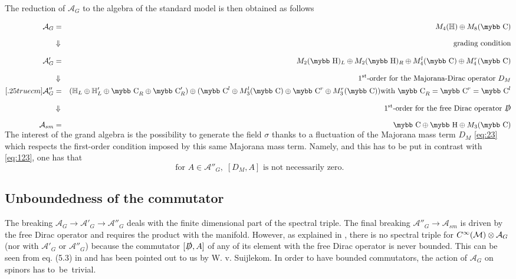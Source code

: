 \documentclass[11pt]{article}
\newcommand{\cinf}{{C^\infty({\cal M})}}
\newcommand{\A}{\mathcal A}
\def\bb#1{\hbox{\mybb#1}}
\begin{document}
\noindent The reduction of $\A_G$ to
  the algebra of the standard model is then obtained as follows
\begin{framed}
\vspace{-.5truecm}

  \begin{eqnarray}
    \label{eq:50}
\mathcal{A}_{G}&=& M_4(\mathbb{H}) \oplus M_8(\bb C) \\[.25truecm]
\nonumber 
&\Downarrow& \hspace{0truecm}\text{grading condition}\\[.25truecm] 
\nonumber
{\cal A}'_G &=& M_2(\bb H)_L\oplus  M_2(\bb H)_R\oplus M_4^l(\bb C) \oplus M_4^r(\bb C)\\[.25truecm]  
\nonumber 
&\Downarrow& \hspace{0truecm}\text{$1^\text{st}$-order for the Majorana-Dirac operator $D_M$}\\ [.25truecm] 
   \nonumber
    \A''_G &=& (\mathbb H_L \oplus \mathbb H'_L \oplus \bb C_R \oplus \bb C'_R) \oplus (\bb C^l\oplus M_3^l(\bb C) \oplus \bb C^r \oplus M^r_3(\bb C))
 \text{with }\bb C_R = \bb C^r=\bb C^l\\[.25truecm] 
\nonumber &\Downarrow&\hspace{0truecm} \text{$1^\text{st}$-order for
  the free Dirac operator $\slashed D$}\\[.25truecm] 
\nonumber
\A_{sm} &=& \bb C \oplus \bb H \oplus M_3(\bb C) \\[-1truecm] 
\vspace{-1.75truecm}
\end{eqnarray}
\end{framed}
The interest of the grand algebra is the 
possibility to generate the
field $\sigma$ thanks to a fluctuation of the Majorana mass term
$D_M$ \eqref{eq:23} which
respects the first-order condition imposed by this same Majorana mass
term. Namely, and  this has to be put in contrast
with \eqref{eq:123}, one has that  \cite{Devastato:2013fk} 
\begin{equation}
\text{ for } A\in\A''_G, \; [D_M, A] \text{ is not
  necessarily zero.}\label{eq:82}
  \end{equation}
\subsection{Unboundedness of the commutator}
\label{unboundsection}

The breaking $\A_G\to\A'_G\to\A''_G$ deals with
the finite
dimensional part of the spectral triple. The final breaking
$\A''_G\to\A_{sm}$ is driven by the free Dirac operator and requires
the product with the manifold. However, as explained in \cite{Devastato:2014fk}, there is no spectral triple
for $\cinf\otimes\A_G$ (nor with $\A'_G$ or $\A''_G$) because the commutator $[\slashed D, A]$ of any
of its element with the free Dirac operator is 
never bounded. This can be seen from eq. (5.3) in
\cite{Devastato:2013fk} and has been pointed out to us by
W. v. Suijlekom. In order to have bounded
commutators, the action of $\A_G$ on spinors has to~be~trivial. 
\end{document}
